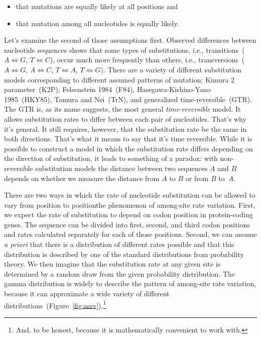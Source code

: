 \begin{itemize}

\item that mutations are equally likely at all positions and

\item that mutation among all nucleotides is equally likely.

\end{itemize}

Let's examine the second of those assumptions first. Observed
differences between nucleotide sequences shows that some types of
substitutions, i.e., transitions~($A \iff G$, $T \iff C$), occur much
more frequently than others, i.e., transversions~($A \iff G$, $A \iff
C$, $T \iff A$, $T \iff G$). There are a variety of different
substitution models corresponding to different assumed patterns of
mutation: Kimura 2 parameter~(K2P), Felsenstein 1984~(F84),
Hasegawa-Kishino-Yano 1985~(HKY85), Tamura and Nei~(TrN), and
generalized time-reversible~(GTR). The GTR is, as its name suggests,
the most general {\it time-reversible\/} model. It allows substitution
rates to differ between each pair of nucleotides. That's why it's
general. It still requires, however, that the substitution rate be the
same in both directions. That's what it means to say that it's time
reversible. While it is possible to construct a model in which the
substitution rate differs depending on the direction of substitution,
it leads to something of a paradox: with non-reversible substitution
models the distance between two sequences $A$ and $B$ depends on
whether we measure the distance from $A$ to $B$ or from $B$ to~$A$.

There are two ways in which the rate of nucleotide substitution can be
allowed to vary from position to position{\dash}the phenomenon of
among-site rate variation. First, we expect the rate of substitution
to depend on codon position in protein-coding genes. The sequence can
be divided into first, second, and third codon positions and rates
calculated separately for each of those positions. Second, we can
assume {\it a priori\/} that there is a distribution of different
rates possible and that this distribution is described by one of the
standard distributions from probability theory. We then imagine that
the substitution rate at any given site is determined by a random draw
from the given probability distribution. The gamma distribution is
widely to describe the pattern of among-site rate variation, because
it can approximate a wide variety of different
distributions~(Figure~\ref{fig:asrv}).\footnote{And, to be honest,
  because it is mathematically convenient to work
  with.}

